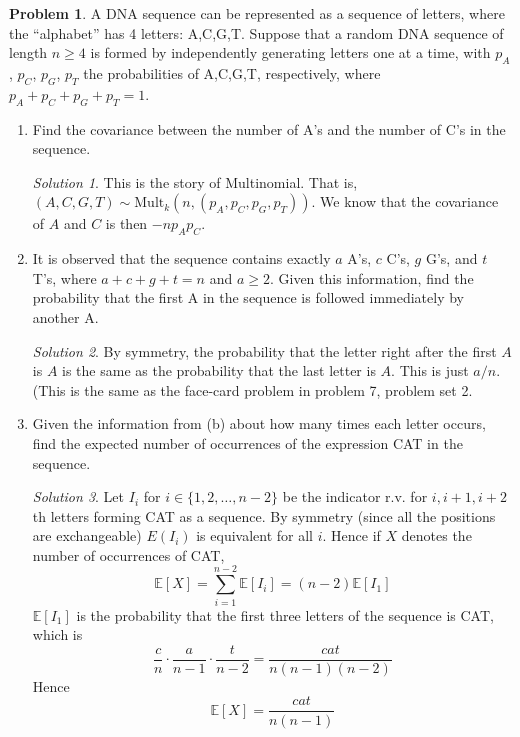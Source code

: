 \documentclass[11pt]{article}
\theoremstyle{definition}
\newtheorem{prob}[theo]{\color{Maroon} Problem}
\theoremstyle{remark}
\newtheorem*{soln}{\color{Maroon} Solution}
\newcommand{\E}[1]{\mathbb{E}\left[ #1 \right]}
\newcommand{\Mult}{\textrm{Mult}}
\begin{document}
\begin{prob}A  DNA sequence can be represented as a sequence of letters, where the ``alphabet''
has 4 letters: A,C,G,T. Suppose that a random DNA sequence of length $n \geq 4$ is formed
by independently generating letters one at a time, with $p_A$, $p_C$, $p_G$, $p_T$ the probabilities of A,C,G,T, respectively, where $p_A + p_C + p_G + p_T = 1$.

\begin{enumerate}[label = (\alph*)]
    \item Find the covariance between the number of A's and the number of C's in the sequence.
    
    \begin{soln} This is the story of Multinomial. That is, $(A,C,G,T) \sim \Mult_k(n,(p_A,p_C,p_G,p_T))$. We know that the covariance of $A$ and $C$ is then $-np_Ap_C$. 
    
    \end{soln}
    
    \dotfill
    
    \item It is observed that the sequence contains exactly $a$ A's, $c$ C's, $g$ G's, and $t$ T's, where $a + c + g + t = n$ and $a \geq 2$. Given this information, find the probability that the first A in the sequence is followed immediately by another A.
    
    \begin{soln} By symmetry, the probability that the letter right after the first $A$ is $A$ is the same as the probability that the last letter is $A$. This is just $a/n$. (This is the same as the face-card problem in problem 7, problem set 2. 
    
    \end{soln}
    
    \dotfill
    
    \item Given the information from (b) about how many times each letter occurs, find the expected number of occurrences of the expression CAT in the sequence.
    
    \begin{soln}
    
    Let $I_i$ for $i \in \{1,2,\ldots,n-2\}$ be the indicator r.v. for $i,i+1,i+2$th letters forming CAT as a sequence. By symmetry (since all the positions are exchangeable) $E(I_i)$ is equivalent for all $i$. Hence if $X$ denotes the number of occurrences of CAT, $$\E{X} = \sum_{i=1}^{n-2} \E{I_i} = (n-2) \E{I_1}$$ $\E{I_1}$ is the probability that the first three letters of the sequence is CAT, which is $$ \frac{c}{n} \cdot \frac{a}{n-1} \cdot \frac{t}{n-2} = \frac{cat}{n(n-1)(n-2)} $$ Hence $$\E{X} = \frac{cat}{n(n-1)}$$
    
    \end{soln}
    
\end{enumerate}

\end{prob}
\end{document}
